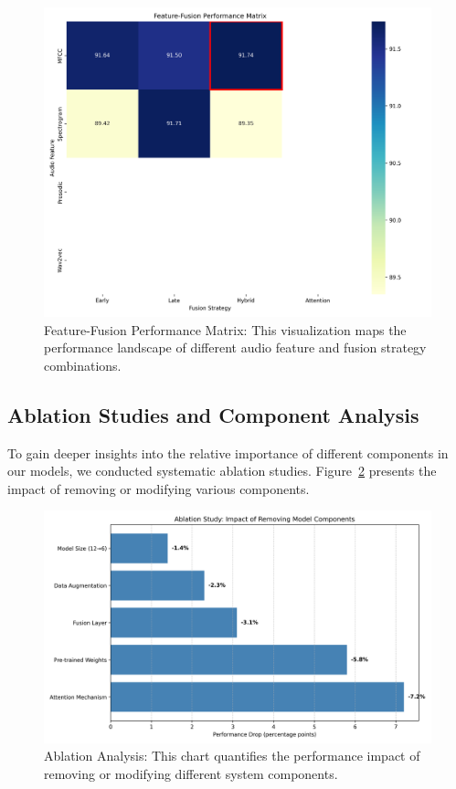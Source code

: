 \documentclass[12pt]{article}
\begin{document}
\begin{figure}[h]
    \centering
    \includegraphics[width=0.9\linewidth]{Figures/feature_fusion_matrix.png}
    \caption{Feature-Fusion Performance Matrix: This visualization maps the performance landscape of different audio feature and fusion strategy combinations.}
    \label{fig:feature_fusion_matrix}
\end{figure}

\subsection{Ablation Studies and Component Analysis}
To gain deeper insights into the relative importance of different components in our models, we conducted systematic ablation studies. Figure~\ref{fig:ablation_analysis} presents the impact of removing or modifying various components.

\begin{figure}[h]
    \centering
    \includegraphics[width=0.9\linewidth]{Figures/ablation_analysis.png}
    \caption{Ablation Analysis: This chart quantifies the performance impact of removing or modifying different system components.}
    \label{fig:ablation_analysis}
\end{figure}
\end{document}
